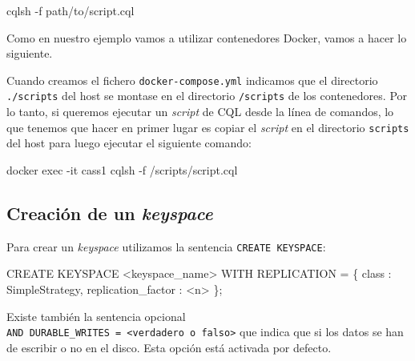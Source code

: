 \documentclass[
]{book}
\newenvironment{Shaded}{}{}
\newcommand{\AttributeTok}[1]{\textcolor[rgb]{0.49,0.56,0.16}{#1}}
\newcommand{\ExtensionTok}[1]{#1}
\newcommand{\NormalTok}[1]{#1}
\begin{document}
\begin{Shaded}
\begin{Highlighting}[]
\ExtensionTok{cqlsh} \AttributeTok{{-}f}\NormalTok{ path/to/script.cql}
\end{Highlighting}
\end{Shaded}

Como en nuestro ejemplo vamos a utilizar contenedores Docker, vamos a hacer lo siguiente.

Cuando creamos el fichero \texttt{docker-compose.yml} indicamos que el directorio \texttt{./scripts} del host se montase en el directorio \texttt{/scripts} de los contenedores. Por lo tanto, si queremos ejecutar un \emph{script} de CQL desde la línea de comandos, lo que tenemos que hacer en primer lugar es copiar el \emph{script} en el directorio \texttt{scripts} del host para luego ejecutar el siguiente comando:

\begin{Shaded}
\begin{Highlighting}[]
\ExtensionTok{docker}\NormalTok{ exec }\AttributeTok{{-}it}\NormalTok{ cass1 cqlsh }\AttributeTok{{-}f}\NormalTok{ /scripts/script.cql}
\end{Highlighting}
\end{Shaded}

\subsection{\texorpdfstring{Creación de un \emph{keyspace}}{Creación de un keyspace}}\label{creaciuxf3n-de-un-keyspace}

Para crear un \emph{keyspace} utilizamos la sentencia \texttt{CREATE\ KEYSPACE}:

\begin{Shaded}
\begin{Highlighting}[]
\NormalTok{CREATE KEYSPACE \textless{}keyspace\_name\textgreater{}}
\NormalTok{  WITH REPLICATION = \{ \textquotesingle{}class\textquotesingle{} : \textquotesingle{}SimpleStrategy\textquotesingle{}, \textquotesingle{}replication\_factor\textquotesingle{} : \textless{}n\textgreater{} \};}
\end{Highlighting}
\end{Shaded}

Existe también la sentencia opcional \texttt{AND\ DURABLE\_WRITES\ =\ \textless{}verdadero\ o\ falso\textgreater{}} que indica que si los datos se han de escribir o no en el disco. Esta opción está activada por defecto.
\end{document}
